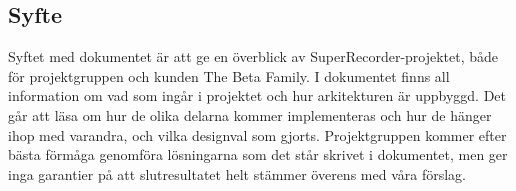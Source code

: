 \subsection{Syfte}

Syftet med dokumentet är att ge en överblick av SuperRecorder-projektet, både för projektgruppen och kunden The Beta Family. I dokumentet finns all information om vad som ingår i projektet och hur arkitekturen är uppbyggd. Det går att läsa om hur de olika delarna kommer implementeras och hur de hänger ihop med varandra, och vilka designval som gjorts. Projektgruppen kommer efter bästa förmåga genomföra lösningarna som det står skrivet i dokumentet, men ger inga garantier på att slutresultatet helt stämmer överens med våra förslag.

